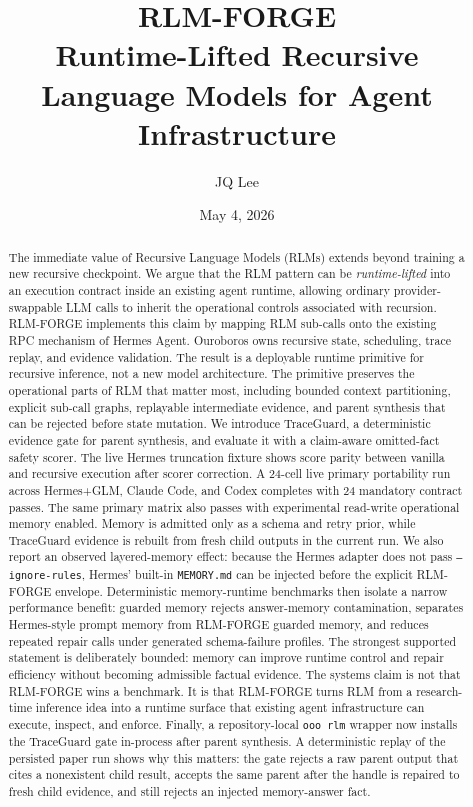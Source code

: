 \documentclass[11pt,a4paper]{article}
\title{RLM-FORGE\\
       Runtime-Lifted Recursive Language Models for Agent Infrastructure}
\author[1]{JQ Lee}
\affil[1]{Independent\\
\texttt{jqyu.lee@gmail.com}}
\date{May 4, 2026}
\begin{document}
\maketitle

\begin{abstract}
The immediate value of Recursive Language Models (RLMs) extends beyond
training a new recursive checkpoint. We argue that the RLM pattern can be
\emph{runtime-lifted} into an execution contract inside an existing agent
runtime, allowing ordinary provider-swappable LLM calls to inherit the
operational controls associated with recursion. RLM-FORGE implements this
claim by mapping RLM sub-calls onto the existing RPC mechanism of Hermes
Agent. Ouroboros owns recursive state, scheduling, trace replay, and evidence
validation. The result is a deployable runtime primitive for recursive
inference, not a new model architecture. The primitive preserves the
operational parts of RLM that matter most, including bounded context
partitioning, explicit sub-call graphs, replayable intermediate evidence,
and parent synthesis that can be rejected before state mutation. We introduce
TraceGuard, a deterministic evidence gate for parent synthesis, and evaluate
it with a claim-aware omitted-fact safety scorer. The live Hermes truncation
fixture shows score parity between vanilla and recursive execution after
scorer correction. A 24-cell live primary portability run across Hermes+GLM,
Claude Code, and Codex completes with 24 mandatory contract passes. The
same primary matrix also passes with experimental read-write operational
memory enabled. Memory is admitted only as a schema and retry prior, while
TraceGuard evidence is rebuilt from fresh child outputs in the current run.
We also report an observed layered-memory effect: because the Hermes adapter
does not pass \texttt{--ignore-rules}, Hermes' built-in \texttt{MEMORY.md}
can be injected before the explicit RLM-FORGE envelope. Deterministic
memory-runtime benchmarks then isolate a narrow performance benefit:
guarded memory rejects answer-memory contamination, separates Hermes-style
prompt memory from RLM-FORGE guarded memory, and reduces repeated repair calls
under generated schema-failure profiles. The strongest supported statement is
deliberately bounded: memory can improve runtime control and repair efficiency
without becoming admissible factual evidence. The systems claim is not that
RLM-FORGE wins a benchmark. It is that RLM-FORGE turns RLM from a research-time
inference idea into a runtime surface that existing agent infrastructure can
execute, inspect, and enforce.
Finally, a repository-local \texttt{ooo rlm} wrapper now installs the
TraceGuard gate in-process after parent synthesis. A deterministic replay of
the persisted paper run shows why this matters: the gate rejects a raw parent
output that cites a nonexistent child result, accepts the same parent after the
handle is repaired to fresh child evidence, and still rejects an injected
memory-answer fact.
\end{abstract}
\end{document}
